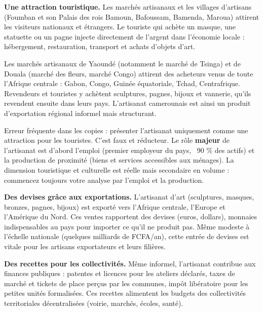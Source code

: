 \documentclass[11pt]{article}
\newcommand{\cle}[1]{{\popxbold\color{popdark}#1}}
\newcounter{popsec}
\newcounter{popsub}
\newcommand{\courssub}[1]{%
  \stepcounter{popsub}%
  \par\vspace{9pt}\noindent{\popxbold\fontsize{11.5}{13}\selectfont\color{popink}{\color{poporange}\thepopsec.\thepopsub}\hspace{6pt}#1}\par\nopagebreak\vspace{4pt}
}
\begin{document}
\textbf{Une attraction touristique.} Les \cle{marchés artisanaux} et les \cle{villages d'artisans} (Foumban et son Palais des rois Bamoun, Bafoussam, Bamenda, Maroua) attirent les visiteurs nationaux et étrangers. Le touriste qui achète un masque, une statuette ou un pagne injecte directement de l'argent dans l'économie locale : hébergement, restauration, transport et achats d'objets d'art.

\begin{savaistu}
Les marchés artisanaux de Yaoundé (notamment le marché de Tsinga) et de Douala (marché des fleurs, marché Congo) attirent des acheteurs venus de toute l'Afrique centrale : Gabon, Congo, Guinée équatoriale, Tchad, Centrafrique. Revendeurs et touristes y achètent sculptures, pagnes, bijoux et vannerie, qu'ils revendent ensuite dans leurs pays. L'artisanat camerounais est ainsi un produit d'exportation régional informel mais structurant.
\end{savaistu}

\begin{attention}
Erreur fréquente dans les copies : présenter l'artisanat uniquement comme une attraction pour les touristes. C'est faux et réducteur. Le rôle \textbf{majeur} de l'artisanat est d'abord \cle{l'emploi} (premier employeur du pays, ~90 \% des actifs) et la \cle{production de proximité} (biens et services accessibles aux ménages). La dimension touristique et culturelle est réelle mais secondaire en volume : commencez toujours votre analyse par l'emploi et la production.
\end{attention}

\courssub{L'importance fiscale et monétaire}

\textbf{Des devises grâce aux exportations.} L'\cle{artisanat d'art} (sculptures, masques, bronzes, pagnes, bijoux) est exporté vers l'Afrique centrale, l'Europe et l'Amérique du Nord. Ces ventes rapportent des \cle{devises} (euros, dollars), monnaies indispensables au pays pour importer ce qu'il ne produit pas. Même modeste à l'échelle nationale (quelques milliards de FCFA/an), cette entrée de devises est vitale pour les artisans exportateurs et leurs filières.

\textbf{Des recettes pour les collectivités.} Même informel, l'artisanat contribue aux finances publiques : \cle{patentes} et licences pour les ateliers déclarés, taxes de marché et tickets de place perçus par les \cle{communes}, impôt libératoire pour les petites unités formalisées. Ces recettes alimentent les budgets des collectivités territoriales décentralisées (voirie, marchés, écoles, santé).
\end{document}

